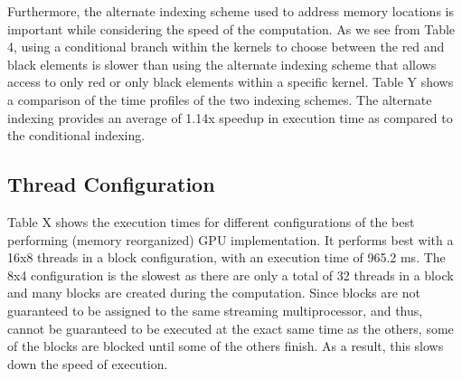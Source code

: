 \documentclass[english]{article}
\begin{document}
	\begin{center}
	\end{center}

	Furthermore, the alternate indexing scheme used to address memory locations is important while considering the speed of the computation. As we see from Table 4, using a conditional branch within the kernels to choose between the red and black elements is slower than using the alternate indexing scheme that allows access to only red or only black elements within a specific kernel. Table Y shows a comparison of the time profiles of the two indexing schemes. The alternate indexing provides an average of 1.14x speedup in execution time as compared to the conditional indexing.

	\begin{center}
	\end{center}

	\subsection{Thread Configuration}
	Table X shows the execution times for different configurations of the best performing (memory reorganized) GPU implementation. It performs best with a 16x8 threads in a block configuration, with an execution time of 965.2 ms. The 8x4 configuration is the slowest as there are only a total of 32 threads in a block and many blocks are created during the computation. Since blocks are not guaranteed to be assigned to the same streaming multiprocessor, and thus, cannot be guaranteed to be executed at the exact same time as the others, some of the blocks are blocked until some of the others finish. As a result, this slows down the speed of execution. 

	\begin{center}
	\end{center}

	\begin{center}
	\end{center}
\end{document}
